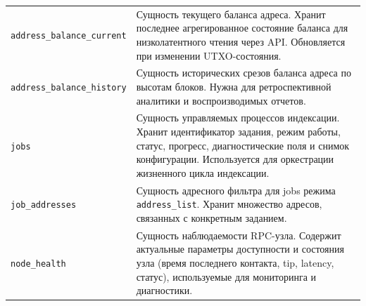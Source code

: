 ﻿\documentclass[14pt,a4paper]{extarticle}
\begin{document}
\begin{longtable}{p{} p{}}
\texttt{address\_balance\_current} & Сущность текущего баланса адреса. Хранит последнее агрегированное состояние баланса для низколатентного чтения через API. Обновляется при изменении UTXO-состояния. \\
\texttt{address\_balance\_history} & Сущность исторических срезов баланса адреса по высотам блоков. Нужна для ретроспективной аналитики и воспроизводимых отчетов. \\
\texttt{jobs} & Сущность управляемых процессов индексации. Хранит идентификатор задания, режим работы, статус, прогресс, диагностические поля и снимок конфигурации. Используется для оркестрации жизненного цикла индексации. \\
\texttt{job\_addresses} & Сущность адресного фильтра для jobs режима \texttt{address\_list}. Хранит множество адресов, связанных с конкретным заданием. \\
\texttt{node\_health} & Сущность наблюдаемости RPC-узла. Содержит актуальные параметры доступности и состояния узла (время последнего контакта, tip, latency, статус), используемые для мониторинга и диагностики. \\
\bottomrule
\end{longtable}
\end{document}
